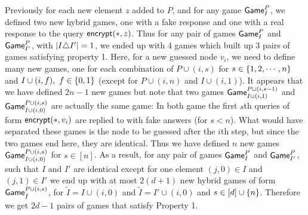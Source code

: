 \documentclass{article}
\newcommand{\encrypt}{{\sf encrypt}}
\newcommand{\game}{{\sf Game}}
\newcommand{\T}{{\mathsf T}}
\newcommand{\dgg}[2]{\game_{#1}^{#2}}
\newcommand{\gpi}{$\game^P_I$}
\begin{document}
Previously for each new element $z$ added to $P$, and for any game \gpi, we defined two new hybrid games, one with a fake response and one with a real response to the query $\encrypt(*,z)$. Thus for any pair of games $\dgg{I}{P}$ and $\dgg{I'}{P}$, with $\left| I \triangle I' \right|=1$, we ended up with 4 games which built up 3 pairs of games satisfying property 1. Here, for a new guessed node $v_i$, we need to define many new games, one for each combination of $P\cup (i,s)$ for $s\in\left\{ 1,2,\cdots,n \right\}$ and $I\cup(i,f), \ f\in\{0,1\}$ (except for $P\cup (i,n)$ and $I \cup (i,1)$). It appears that we have defined $2n-1$ new games but note that two games $\dgg {I\cup (i,1)}{P\cup(i,s-1)}$ and $\dgg {I\cup (i,0)}{P\cup(i,s)}$ are actually the same game: In both game the first $s$th queries of form $\encrypt(*,v_i)$ are replied to with fake answers (for $s<n$). What would have separated these games is the node to be guessed after the $i$th step, but since the two games end here, they are identical. Thus we have defined $n$ new games $\dgg {I\cup (i,0)}{P\cup(i,s)}$ for $s\in [n]$. %
As a result, for any pair of games $\dgg{I}{P}$ and $\dgg{I'}{P}$, such that $I$ and $I'$ are identical except for one element $(j,0)\in I$ and $(j,1)\in I'$ we end up with at most $2(d+1)$ new hybrid games of form $\dgg{\tilde{I}}{P\cup (i,s)}$, for $\tilde{I}=I\cup (i,0)$ and $\tilde{I}=I'\cup (i,0)$ and $s\in [d]\cup \left\{ n \right\}$. Therefore we get $2d-1$ pairs of games that satisfy Property 1. 
\end{document}
